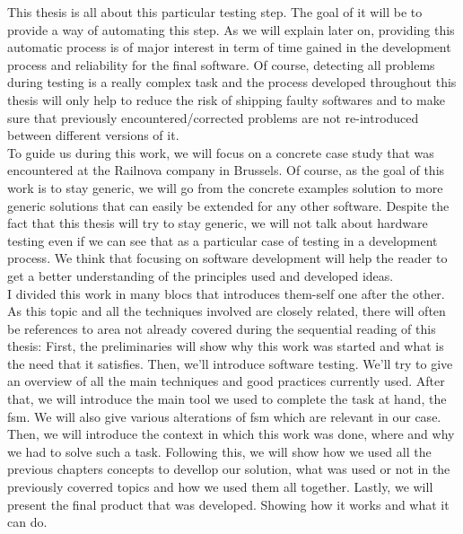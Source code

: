 \documentclass[12pt]{article}
\theoremstyle{definition}
\theoremstyle{definition}
\theoremstyle{remark}
\begin{document}
This thesis is all about this particular testing step. The goal of it will be to provide a way of automating this step. As we will explain later on, providing this automatic process is of major interest in term of time gained in the development process and reliability for the final software. Of course, detecting all problems during testing is a really complex task and the process developed throughout this thesis will only help to reduce the risk of shipping faulty softwares and to make sure that previously encountered/corrected problems are not re-introduced between different versions of it.\\

To guide us during this work, we will focus on a concrete case study that was encountered at the Railnova company in Brussels. Of course, as the goal of this work is to stay generic, we will go from the concrete examples solution to more generic solutions that can easily be extended for any other software. Despite the fact that this thesis will try to stay generic, we will not talk about hardware testing even if we can see that as a particular case of testing in a development process. We think that focusing on software development will help the reader to get a better understanding of the principles used and developed ideas.\\

I divided this work in many blocs that introduces them-self one after the other. As this topic and all the techniques involved are closely related, there will often be references to area not already covered during the sequential reading of this thesis:
First, the preliminaries will show why this work was started and what is the need that it satisfies. Then, we'll introduce software testing. We'll try to give an overview of all the main techniques and good practices currently used. After that, we will introduce the main tool we used to complete the task at hand, the \gls{fsm}. We will also give various alterations of \gls{fsm} which are relevant in our case. Then, we will introduce the context in which this work was done, where and why we had to solve such a task. Following this, we will show how we used all the previous chapters concepts to devellop our solution, what was used or not in the previously coverred topics and how we used them all together. Lastly, we will present the final product that was developed. Showing how it works and what it can do.


\end{document}
